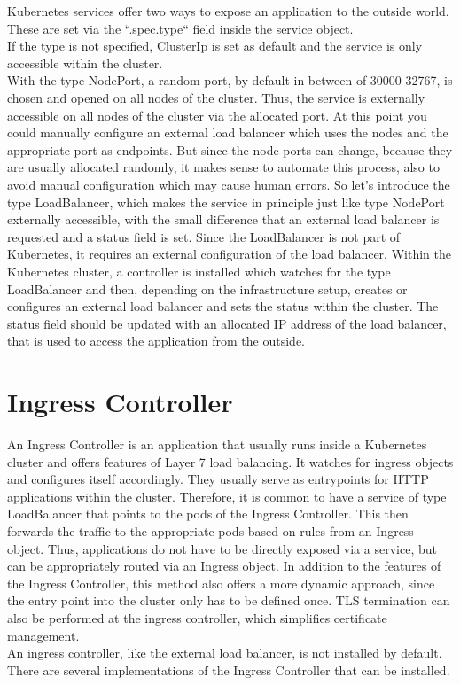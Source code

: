 Kubernetes services offer two ways to expose an application to the outside world.
These are set via the ``.spec.type`` field inside the service object.
\\
If the type is not specified, ClusterIp is set as default and the service is only accessible within the cluster.
\\
With the type NodePort, a random port, by default in between of 30000-32767, is chosen and opened on all nodes of the cluster.
Thus, the service is externally accessible on all nodes of the cluster via the allocated port.
At this point you could manually configure an external load balancer which uses the nodes and the appropriate port as endpoints.
But since the node ports can change, because they are usually allocated randomly, it makes sense to automate this process, also to avoid manual configuration which may cause human errors.
So let's introduce the type LoadBalancer, which makes the service in principle just like type NodePort externally accessible, with the small difference that an external load balancer is requested and a status field is set.
Since the LoadBalancer is not part of Kubernetes, it requires an external configuration of the load balancer.
Within the Kubernetes cluster, a controller is installed which watches for the type LoadBalancer and then, depending on the infrastructure setup, creates or configures an external load balancer and sets the status within the cluster.
The status field should be updated with an allocated IP address of the load balancer, that is used to access the application from the outside.

\section{Ingress Controller}\label{sec:IngressController}

An Ingress Controller is an application that usually runs inside a Kubernetes cluster and offers features of Layer 7 load balancing.
It watches for ingress objects and configures itself accordingly.
They usually serve as entrypoints for HTTP applications within the cluster.
Therefore, it is common to have a service of type LoadBalancer that points to the pods of the Ingress Controller.
This then forwards the traffic to the appropriate pods based on rules from an Ingress object.
Thus, applications do not have to be directly exposed via a service, but can be appropriately routed via an Ingress object.
In addition to the features of the Ingress Controller, this method also offers a more dynamic approach, since the entry point into the cluster only has to be defined once.
TLS termination can also be performed at the ingress controller, which simplifies certificate management.
\\
An ingress controller, like the external load balancer, is not installed by default.
There are several implementations of the Ingress Controller that can be installed.

